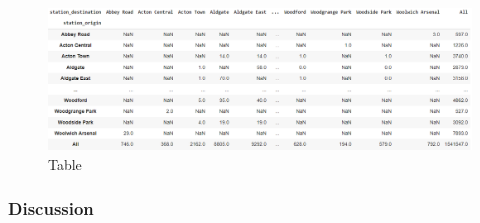 \documentclass[10pt]{report}
\numberwithin{figure}{section}
\numberwithin{table}{section}
\begin{document}
    \begin{figure}[htp]
        \centering
        \includegraphics[width=16cm]{Image/Part2_OD8_scenario B.png}
        \caption{Table}
        \label{fig:galaxy}
    \end{figure}

\newpage    

\subsubsection{Discussion}













\newpage
\printbibliography[title = {References}]
\end{document}
